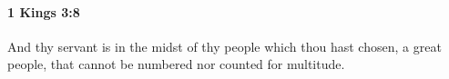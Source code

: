 
		\paragraph{1 Kings 3:8} %
			\label{1KINGS-3-8}

			And thy servant is in the midst of thy people which thou hast chosen, a great people, that cannot be numbered nor counted for multitude.


